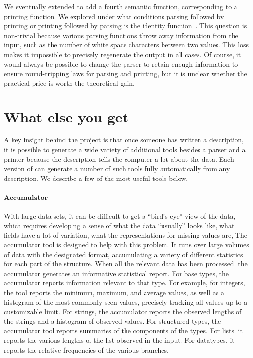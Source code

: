 \documentclass{sig-alternate}
\begin{document}
We eventually extended \ddca{} to add a fourth semantic function,
corresponding to a printing function.  We explored under what
conditions parsing followed by printing or printing followed by
parsing is the identity function~\cite{fisher+:ddc-printing}.  This
question is non-trivial because various parsing functions throw away
information from the input, such as the number of white space
characters between two values.  This loss makes it impossible to
precisely regenerate the output in all cases.  Of course, it would always 
be possible to change
the parser to retain enough information to ensure round-tripping laws for
parsing and printing, but it is unclear whether the practical price is worth the theoretical
gain.



\section{What else you get}
\label{sec:tools}
A key insight behind the \pads{} project is that once someone has
written a description, it is possible to generate a wide variety of
additional tools besides a parser and a printer because the description
tells the computer a lot about the data.  Each version of \pads{}
can generate a number of such tools fully automatically from any
description.  We describe a few of the most useful tools below.


\paragraph{Accumulator} With large data sets, it can be difficult to get a
  ``bird's eye'' view of the data, which requires developing a sense
  of what the data ``usually'' looks like, what fields have a lot of
  variation, what the representations for missing values are, \etc{} 
  The accumulator tool is designed to help with this problem.  
  It runs over large volumes of data with the designated format,
  accumulating a variety of different statistics for each part of the
  structure.  When all the relevant data has been
  processed, the accumulator generates an informative statistical report.
  For base types, the accumulator reports
  information relevant to that type.  For example, for integers, the
  tool reports the minimum, maximum, and average values, as well as a
  histogram of the most commonly seen values, precisely tracking all
  values up to a customizable limit.  For strings, the accumulator
  reports the observed lengths of the strings and a histogram of
  observed values.  For structured types, the accumulator tool reports
  summaries of the components of the types.  For lists, it reports the
  various lengths of the list observed in the input.  For datatypes,
  it reports the relative frequencies of the various branches.  
\end{document}
